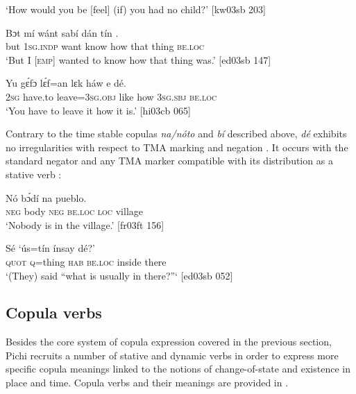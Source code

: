 \glt ‘How would you be [feel] (if) you had no child?’ [kw03sb 203]
\z


\ea%
    \label{ex:key:791}
    \gll Bɔt  mí    wánt  sabí        dán    tín    .\\
but  \textsc{1sg.indp}  want  know  how    that    thing  \textsc{be.loc}\\

\glt ‘But I \textsc{[emp]} wanted to know how that thing was.’ [ed03sb 147]
\z


\ea%
    \label{ex:key:792}
    \gll Yu  gɛ́fɔ    lɛ́f=an    lɛk  háw    e    dé.\\
\textsc{2sg}  have.to  leave=\textsc{3sg.obj}  like  how    \textsc{3sg.sbj}  \textsc{be.loc}\\

\glt ‘You have to leave it how it is.’ [hi03cb 065]
\z

Contrary to the time stable copulas \textit{na}\textit{\textup{/}}\textit{nóto} and \textit{bí} described above, \textit{dé} exhibits no irregularities with respect to \textsc{TMA} marking and negation . It occurs with the standard negator and any \textsc{TMA} marker compatible with its distribution as a stative verb :


\ea%
    \label{ex:key:793}
    \gll Nó  bɔ́dí          na  pueblo.\\
\textsc{neg}  body  \textsc{neg}  \textsc{be.loc}  \textsc{loc}  village\\

\glt ‘Nobody is in the village.’ [fr03ft 156]
\z


\ea%
    \label{ex:key:794}
    \gll Sé  ‘ús=tín       ínsay  dé?’\\
\textsc{quot}  \textsc{q}=thing  \textsc{hab}  \textsc{be.loc}  inside  there\\

\glt ‘(They) said “what is usually in there?”‘ [ed03sb 052]
\z

\subsection{Copula verbs}\label{sec:7.6.2}

Besides the core system of copula expression covered in the previous section, Pichi recruits a number of stative and dynamic verbs in order to express more specific copula meanings linked to the notions of change-of-state and existence in place and time. Copula verbs and their meanings are provided in .

